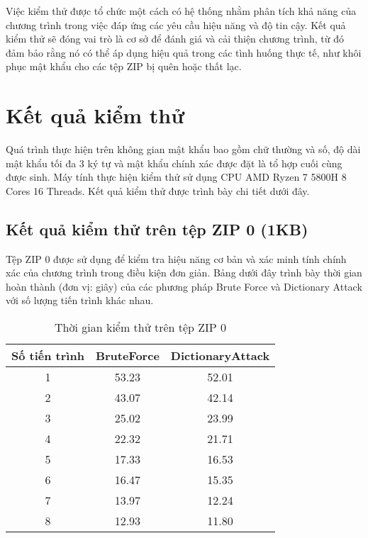 \documentclass[../DoAn.tex]{subfiles}
\begin{document}
Việc kiểm thử được tổ chức một cách có hệ thống nhằm phân tích khả năng của chương trình trong việc đáp ứng các yêu cầu hiệu năng và độ tin cậy. Kết quả kiểm thử sẽ đóng vai trò là cơ sở để đánh giá và cải thiện chương trình, từ đó đảm bảo rằng nó có thể áp dụng hiệu quả trong các tình huống thực tế, như khôi phục mật khẩu cho các tệp ZIP bị quên hoặc thất lạc.

\section{Kết quả kiểm thử}

Quá trình thực hiện trên không gian mật khẩu bao gồm chữ thường và số, độ dài mật khẩu tối đa 3 ký tự và mật khẩu chính xác được đặt là tổ hợp cuối cùng được sinh. Máy tính thực hiện kiểm thử sử dụng CPU AMD Ryzen 7 5800H 8 Cores 16 Threads. Kết quả kiểm thử được trình bày chi tiết dưới đây.

 
\subsection{Kết quả kiểm thử trên tệp ZIP 0 (1KB)} 

Tệp ZIP 0 được sử dụng để kiểm tra hiệu năng cơ bản và xác minh tính chính xác của chương trình trong điều kiện đơn giản. Bảng dưới đây trình bày thời gian hoàn thành (đơn vị: giây) của các phương pháp Brute Force và Dictionary Attack với số lượng tiến trình khác nhau.

\begin{table}[h]
    \centering
    \begin{tabular}{|c|c|c|}
    \toprule
    Số tiến trình & BruteForce & DictionaryAttack \\
    \midrule
    1 & 53.23 & 52.01 \\ \hline 
    2 & 43.07 & 42.14 \\ \hline 
    3 & 25.02 & 23.99 \\ \hline 
    4 & 22.32 & 21.71 \\ \hline 
    5 & 17.33 & 16.53 \\ \hline 
    6 & 16.47 & 15.35 \\ \hline 
    7 & 13.97 & 12.24 \\
    8 & 12.93 & 11.80 \\
    \bottomrule \hline
    \end{tabular}
    \caption{Thời gian kiểm thử trên tệp ZIP 0}
    \label{tab:comparison}
\end{table}
\end{document}
